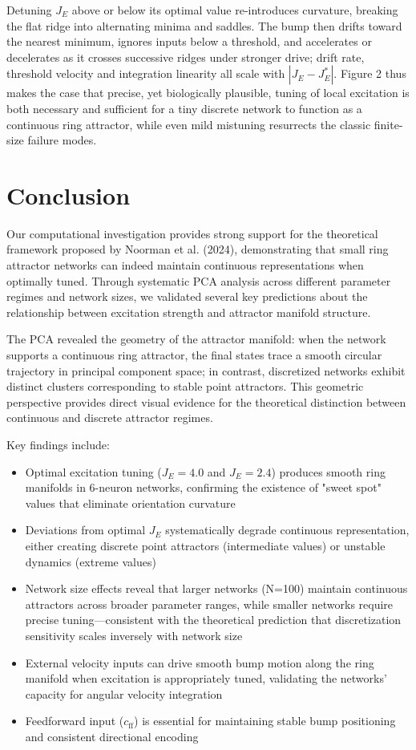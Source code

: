 \documentclass[11pt,a4paper]{article}
\begin{document}
Detuning \(J_E\) above or below its optimal value re-introduces curvature, breaking the flat ridge into alternating minima and saddles.  The bump then drifts toward the nearest minimum, ignores inputs below a threshold, and accelerates or decelerates as it crosses successive ridges under stronger drive; drift rate, threshold velocity and integration linearity all scale with \(|J_E-J_E^{\!*}|\).  Figure 2 thus makes the case that precise, yet biologically plausible, tuning of local excitation is both necessary and sufficient for a tiny discrete network to function as a continuous ring attractor, while even mild mistuning resurrects the classic finite-size failure modes.

\section{Conclusion}

Our computational investigation provides strong support for the theoretical framework proposed by Noorman et al. (2024), demonstrating that small ring attractor networks can indeed maintain continuous representations when optimally tuned. 
Through systematic PCA analysis across different parameter regimes and network sizes, we validated several key predictions about the relationship between excitation strength and attractor manifold structure.

The PCA revealed the geometry of the attractor manifold: when the network supports a continuous ring attractor, the final states trace a smooth circular trajectory in principal component space; in contrast, discretized networks exhibit distinct clusters corresponding to stable point attractors. This geometric perspective provides direct visual evidence for the theoretical distinction between continuous and discrete attractor regimes.

Key findings include:
\begin{itemize}
\item Optimal excitation tuning (\(J_E = 4.0\) and \(J_E = 2.4\)) produces smooth ring manifolds in 6-neuron networks, confirming the existence of "sweet spot" values that eliminate orientation curvature
\item Deviations from optimal \(J_E\) systematically degrade continuous representation, either creating discrete point attractors (intermediate values) or unstable dynamics (extreme values)
\item Network size effects reveal that larger networks (N=100) maintain continuous attractors across broader parameter ranges, while smaller networks require precise tuning—consistent with the theoretical prediction that discretization sensitivity scales inversely with network size
\item External velocity inputs can drive smooth bump motion along the ring manifold when excitation is appropriately tuned, validating the networks' capacity for angular velocity integration
\item Feedforward input (\(c_{\text{ff}}\)) is essential for maintaining stable bump positioning and consistent directional encoding
\end{itemize}
\end{document}
